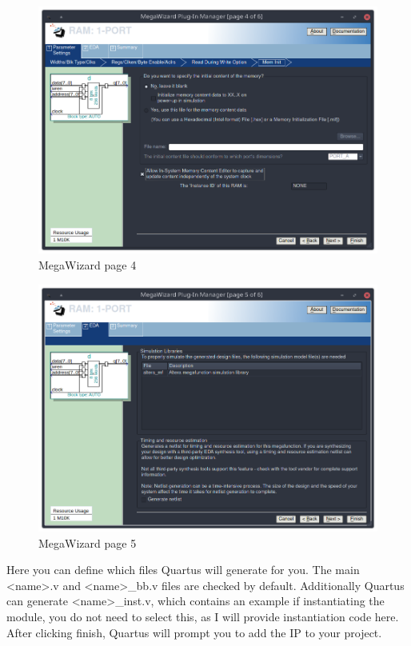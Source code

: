 \documentclass[letter,12pt]{article}
\begin{document}
\begin{figure}[H]
  \centering
  \includegraphics[width=.83\linewidth]{pics/Mega4.png}
  \caption{MegaWizard page 4}
\end{figure}
\begin{figure}[H]
  \centering
  \includegraphics[width=.83\linewidth]{pics/Mega5.png}
  \caption{MegaWizard page 5}
\end{figure}

Here you can define which files Quartus will generate for you. The main \textless name\textgreater.v and \textless name\textgreater\_bb.v files are checked by default. Additionally Quartus can generate \textless name\textgreater\_inst.v, which contains an example if instantiating the module, you do not need to select this, as I will provide instantiation code here.
After clicking finish, Quartus will prompt you to add the IP to your project.
\end{document}
